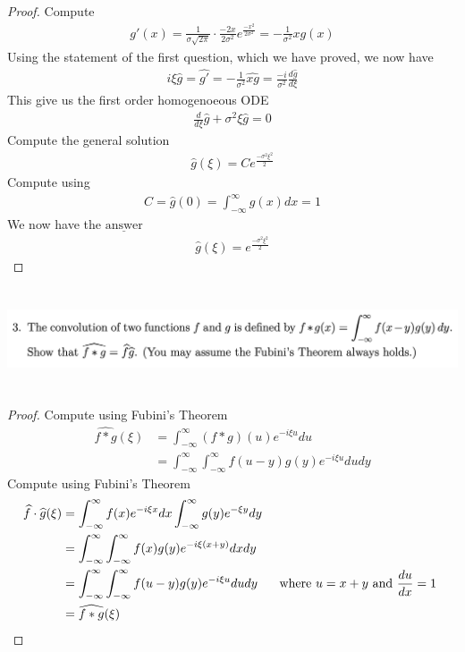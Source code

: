 \documentclass{report}
\begin{document}
\begin{proof}
Compute 
\begin{align*}
g'(x)=\frac{1}{\sigma \sqrt{2\pi} }\cdot \frac{-2x}{2\sigma^2}  e^{\frac{-x^2}{2\sigma^2}}= -\frac{1}{\sigma^2}xg(x)
\end{align*}
Using the statement of the first question, which we have proved, we now have 
\begin{align*}
  i \xi \widehat{g}= \widehat{g'} = - \frac{1}{\sigma^2} \widehat{xg} =  \frac{-i}{\sigma^2}  \frac{d\widehat{g}}{d\xi}
\end{align*}
This give us the first order homogenoeous ODE 
\begin{align*}
  \frac{d}{d\xi}\widehat{g}+ \sigma^2 \xi \widehat{g}=0
\end{align*}
Compute the general solution 
\begin{align*}
\widehat{g}(\xi)= C e^{\frac{-\sigma^2 \xi^2}{2}}
\end{align*}
Compute using 
\begin{align*}
C=\widehat{g}(0)=\int_{-\infty}^{\infty}g(x)dx=1
\end{align*}
We now have the $\underline{\text{answer}}$ 
\begin{align*}
\widehat{g}(\xi)=e^{\frac{-\sigma^2\xi^2}{2}}
\end{align*}
\end{proof}

\begin{question}{}{}
\includegraphics[height=3cm,width=18cm]{hw3q3}
\end{question}
\begin{proof}
Compute using Fubini's Theorem
\begin{align*}
  \widehat{f*g}(\xi)&=\int_{-\infty}^{\infty}(f*g)(u)e^{-i\xi u}du\\
  &=\int_{-\infty}^{\infty}\int_{-\infty}^{\infty}f(u-y)g(y)e^{-i\xi u}dudy
\end{align*}
Compute using Fubini's Theorem 
\begin{align*}
\widehat{f}\cdot \widehat{g}(\xi)&=\int_{-\infty}^{\infty}f(x)e^{-i\xi x}dx\int_{-\infty}^{\infty}g(y)e^{-\xi y}dy\\
&=\int_{-\infty}^{\infty}\int_{-\infty}^{\infty}f(x)g(y)e^{-i\xi (x+y)}dxdy\\
  &=\int_{-\infty}^{\infty}\int_{-\infty}^{\infty}f(u-y)g(y)e^{-i\xi u}dudy\hspace{0.5cm}\text{ where $u=x+y$ and  $\frac{du}{dx}=1$ }\\
  &=\widehat{f*g}(\xi)
\end{align*}
\end{proof}
\end{document}
